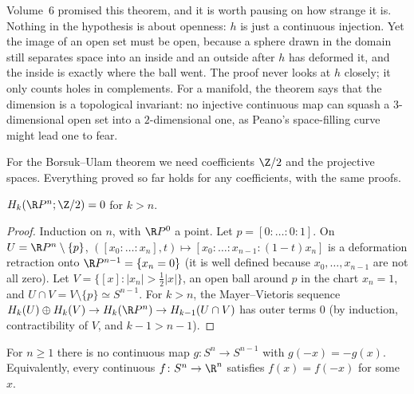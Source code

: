 \begin{beauty}
Volume~6 promised this theorem, and it is worth pausing on how strange it is. Nothing in the hypothesis is about openness: $h$ is just a continuous injection. Yet the image of an open set must
be open, because a sphere drawn in the domain still separates space into an inside and an outside after $h$ has deformed it, and the inside is exactly where the ball went. The proof never
looks at $h$ closely; it only counts holes in complements. For a manifold, the theorem says that the dimension is a topological invariant: no injective continuous map can squash a
$3$-dimensional open set into a $2$-dimensional one, as Peano's space-filling curve might lead one to fear.
\end{beauty}

For the Borsuk--Ulam theorem we need coefficients $\Z/2$ and the projective spaces. Everything proved so far holds for any coefficients, with the same proofs.

\begin{lemma}\label{lem:rpn}
$H_k(\R P^n;\Z/2)=0$ for $k>n$.
\end{lemma}

\begin{proof}
Induction on $n$, with $\R P^0$ a point. Let $p=[0:\dots:0:1]$. On $U=\R P^n\setminus\{p\}$, $([x_0:\dots:x_n],t)\mapsto[x_0:\dots:x_{n-1}:(1-t)x_n]$ is a deformation retraction onto $\R P^{n-1}=\{x_n=0\}$ (it is
well defined because $x_0,\dots,x_{n-1}$ are not all zero). Let $V=\{[x]:|x_n|>\frac12|x|\}$, an open ball around $p$ in the chart $x_n=1$, and $U\cap V=V\setminus\{p\}\simeq S^{n-1}$. For $k>n$, the Mayer--Vietoris
sequence $H_k(U)\oplus H_k(V)\to H_k(\R P^n)\to H_{k-1}(U\cap V)$ has outer terms $0$ (by induction, contractibility of $V$, and $k-1>n-1$).
\end{proof}

\begin{theorem}\label{thm:borsukulam}
For $n\ge1$ there is no continuous map $g\colon S^n\to S^{n-1}$ with $g(-x)=-g(x)$. Equivalently, every continuous $f\colon S^n\to\R^n$ satisfies $f(x)=f(-x)$ for some $x$.
\end{theorem}

